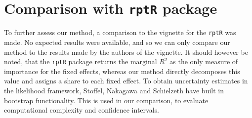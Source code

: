

\section{Comparison with \texttt{rptR} package}
To further assess our method, a comparison to the vignette for the \texttt{rptR} was made. No expected results were available, and so we can only compare our method to the results made by the authors of the vignette. It should however be noted, that the \texttt{rptR} package returns the marginal $R^2$ as the only measure of importance for the fixed effects, whereas our method directly decomposes this value and assigns a share to each fixed effect. To obtain uncertainty estimates in the likelihood framework, Stoffel, Nakagawa and Schielzeth have built in bootstrap functionality. This is used in our comparison, to evaluate computational complexity and confidence intervals.
\\
\\
